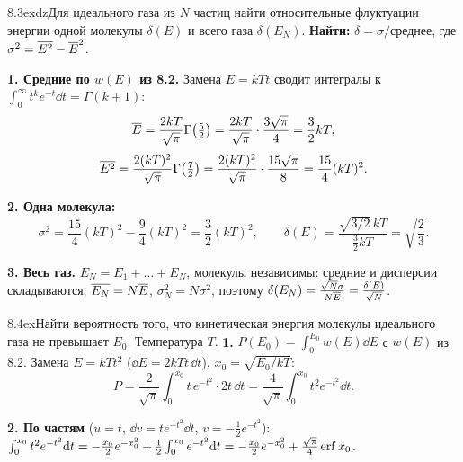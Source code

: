 \begin{problem}{8.3}{exdz}{Для идеального газа из $N$ частиц найти относительные флуктуации энергии одной молекулы $\delta(E)$ и всего газа $\delta(E_N)$.}
\textbf{Найти:} $\delta=\sigma/\text{среднее}$, где $\sigma^2=\overline{E^2}-\overline{E}^2$.

\textbf{1. Средние по $w(E)$ из 8.2.} Замена $E=kTt$ сводит интегралы к $\int_0^\infty t^{k}e^{-t}\dd t=\Gamma(k+1)$:
\[\overline{E}=\frac{2kT}{\sqrt\pi}\Gamma\big(\tfrac52\big)=\frac{2kT}{\sqrt\pi}\cdot\frac{3\sqrt\pi}{4}=\frac32kT,\]
\[\overline{E^2}=\frac{2(kT)^2}{\sqrt\pi}\Gamma\big(\tfrac72\big)=\frac{2(kT)^2}{\sqrt\pi}\cdot\frac{15\sqrt\pi}{8}=\frac{15}4(kT)^2.\]

\textbf{2. Одна молекула:}
\[\sigma^2=\frac{15}4(kT)^2-\frac94(kT)^2=\frac32(kT)^2,\qquad \delta(E)=\frac{\sqrt{3/2}\,kT}{\frac32kT}=\sqrt{\frac23}.\]

\textbf{3. Весь газ.} $E_N=E_1+\dots+E_N$, молекулы независимы: средние и дисперсии складываются,
$\overline{E_N}=N\overline{E}$, $\sigma_N^2=N\sigma^2$, поэтому $\delta(E_N)=\frac{\sqrt N\sigma}{N\overline{E}}=\frac{\delta(E)}{\sqrt N}$.
\end{problem}

\begin{problem}{8.4}{ex}{Найти вероятность того, что кинетическая энергия молекулы идеального газа не превышает $E_0$. Температура $T$.}
\textbf{1.} $P(E_0)=\int_0^{E_0}w(E)\dd E$ с $w(E)$ из 8.2. Замена $E=kTt^2$ ($\dd E=2kTt\,\dd t$), $x_0=\sqrt{E_0/kT}$:
\[P=\frac{2}{\sqrt\pi}\int_0^{x_0}t\,e^{-t^2}\cdot2t\,\dd t=\frac4{\sqrt\pi}\int_0^{x_0}t^2e^{-t^2}\dd t.\]

\textbf{2. По частям} ($u=t$, $\dd v=te^{-t^2}\dd t$, $v=-\frac12e^{-t^2}$):
$\int_0^{x_0}t^2e^{-t^2}\mathrm{d} t=-\frac{x_0}2e^{-x_0^2}+\frac12\int_0^{x_0}e^{-t^2}\mathrm{d} t=-\frac{x_0}2e^{-x_0^2}+\frac{\sqrt\pi}4\operatorname{erf} x_0$.
\end{problem}

